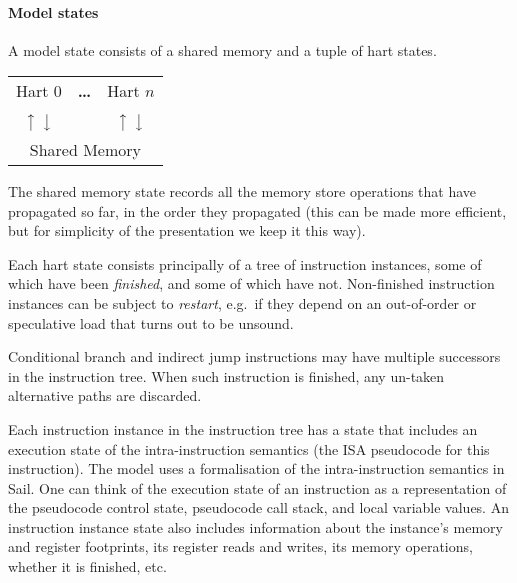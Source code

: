 \paragraph{Model states}
A model state consists of a shared memory and a tuple of hart states.
\begin{center}
\sffamily
\begin{tabular}{ccc}
\cline{1-1}\cline{3-3}
\multicolumn{1}{|c|}{Hart 0} & \bf \dots & \multicolumn{1}{|c|}{Hart $n$} \\
\cline{1-1}\cline{3-3}
$\big\uparrow$ $\big\downarrow$ & & $\big\uparrow$ $\big\downarrow$ \\
\hline
\multicolumn{3}{|c|}{Shared Memory} \\
\hline
\end{tabular}
\end{center}
The shared memory state records all the memory store operations that have propagated so far, in the order they propagated (this can be made more efficient, but for simplicity of the presentation we keep it this way).

Each hart state consists principally of a tree of instruction instances, some of which have been \emph{finished}, and some of which have not.
Non-finished instruction instances can be subject to \emph{restart}, e.g.~if they depend on an out-of-order or speculative load that turns out to be unsound.

Conditional branch and indirect jump instructions may have multiple successors in the instruction tree.
When such instruction is finished, any un-taken alternative paths are discarded.

Each instruction instance in the instruction tree has a state that
includes an execution state of the intra-instruction semantics (the
ISA pseudocode for this instruction).
The model uses a formalisation of the intra-instruction semantics in Sail.
One can think of the execution state of an instruction as a representation of the pseudocode control state, pseudocode call stack, and local variable values.
An instruction instance state also includes information about the instance's memory and register footprints, its register reads and writes, its memory operations, whether it is finished, etc.

